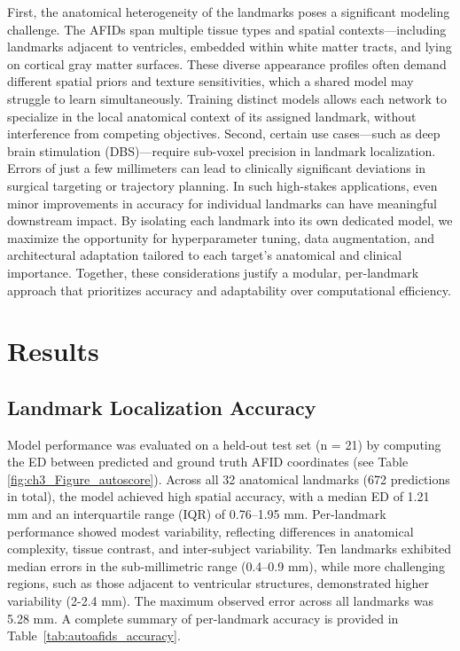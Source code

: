 First, the anatomical heterogeneity of the landmarks poses a significant modeling challenge. The AFIDs span multiple tissue types and spatial contexts—including landmarks adjacent to ventricles, embedded within white matter tracts, and lying on cortical gray matter surfaces. These diverse appearance profiles often demand different spatial priors and texture sensitivities, which a shared model may struggle to learn simultaneously. Training distinct models allows each network to specialize in the local anatomical context of its assigned landmark, without interference from competing objectives. Second, certain use cases—such as deep brain stimulation (DBS)—require sub-voxel precision in landmark localization. Errors of just a few millimeters can lead to clinically significant deviations in surgical targeting or trajectory planning. In such high-stakes applications, even minor improvements in accuracy for individual landmarks can have meaningful downstream impact. By isolating each landmark into its own dedicated model, we maximize the opportunity for hyperparameter tuning, data augmentation, and architectural adaptation tailored to each target's anatomical and clinical importance. Together, these considerations justify a modular, per-landmark approach that prioritizes accuracy and adaptability over computational efficiency.

\section{Results}
\subsection{Landmark Localization Accuracy}
Model performance was evaluated on a held-out test set (n = 21) by computing the ED between predicted and ground truth AFID coordinates (see Table \ref{fig:ch3_Figure_autoscore}). Across all 32 anatomical landmarks (672 predictions in total), the model achieved high spatial accuracy, with a median ED of 1.21 mm and an interquartile range (IQR) of 0.76–1.95 mm. Per-landmark performance showed modest variability, reflecting differences in anatomical complexity, tissue contrast, and inter-subject variability. Ten landmarks exhibited median errors in the sub-millimetric range (0.4–0.9 mm), while more challenging regions, such as those adjacent to ventricular structures, demonstrated higher variability (2-2.4 mm). The maximum observed error across all landmarks was 5.28 mm. A complete summary of per-landmark accuracy is provided in Table~\ref{tab:autoafids_accuracy}.

